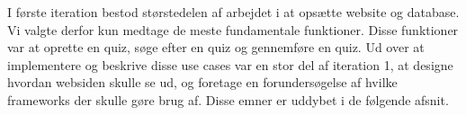 I første iteration bestod størstedelen af arbejdet i at opsætte website og database. Vi valgte derfor kun medtage de meste fundamentale funktioner. Disse funktioner var at oprette en quiz, søge efter en quiz og gennemføre en quiz. Ud over at implementere og beskrive disse use cases var en stor del af iteration 1, at designe hvordan websiden skulle se ud, og foretage en forundersøgelse af hvilke frameworks der skulle gøre brug af. Disse emner er uddybet i de følgende afsnit.
















